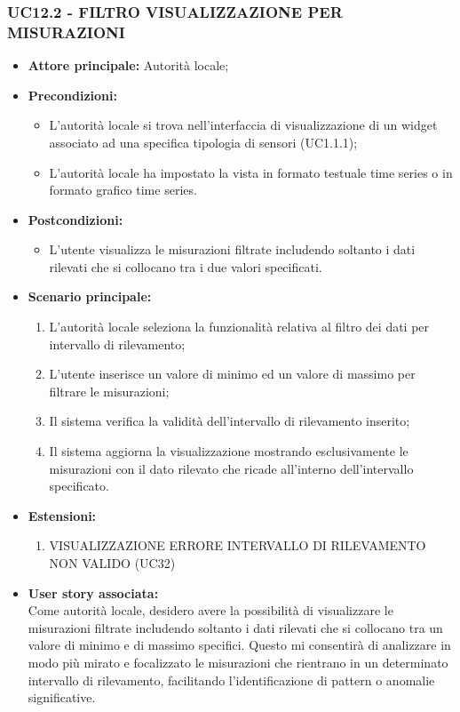 \subsubsection{UC12.2 - FILTRO VISUALIZZAZIONE PER MISURAZIONI}
\begin{itemize}
    \item \textbf{Attore principale:} Autorità locale;
    \item \textbf{Precondizioni:}
        \begin{itemize}
            \item L'autorità locale si trova nell'interfaccia di visualizzazione di un widget associato ad una specifica tipologia di sensori (UC1.1.1);
            \item L'autorità locale ha impostato la vista in formato testuale time series o in formato grafico time series.
        \end{itemize}
    \item \textbf{Postcondizioni:}
        \begin{itemize}
            \item L'utente visualizza le misurazioni filtrate includendo soltanto i dati rilevati che si collocano tra i due valori specificati.
        \end{itemize}
    \item \textbf{Scenario principale:}
        \begin{enumerate}
            \item L'autorità locale seleziona la funzionalità relativa al filtro dei dati per intervallo di rilevamento;
            \item L'utente inserisce un valore di minimo ed un valore di massimo per filtrare le misurazioni;
            \item Il sistema verifica la validità dell'intervallo di rilevamento inserito;
            \item Il sistema aggiorna la visualizzazione mostrando esclusivamente le misurazioni con il dato rilevato che ricade all'interno dell'intervallo specificato.
        \end{enumerate}
    \item \textbf{Estensioni:}
        \begin{enumerate}
            \item VISUALIZZAZIONE ERRORE INTERVALLO DI RILEVAMENTO NON VALIDO (UC32)
        \end{enumerate}
    \item \textbf{User story associata:} \\
        Come autorità locale, desidero avere la possibilità di visualizzare le misurazioni filtrate includendo soltanto i dati rilevati che si collocano tra un valore di minimo e di massimo specifici. Questo mi consentirà di analizzare in modo più mirato e focalizzato le misurazioni che rientrano in un determinato intervallo di rilevamento, facilitando l'identificazione di pattern o anomalie significative.
\end{itemize}
